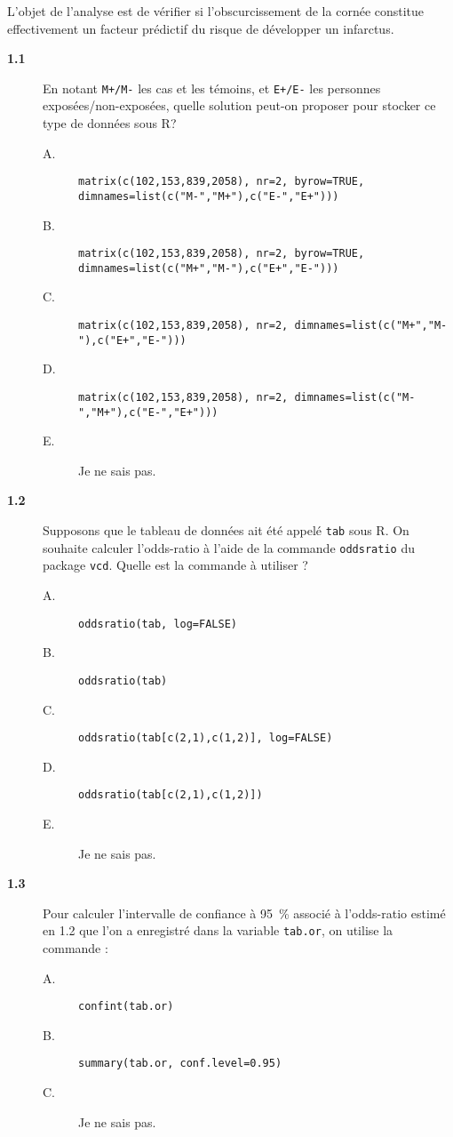 \documentclass[11pt]{report}
\theoremstyle{definition}
\newcommand{\R}{\textsf{R}\xspace}
\begin{document}
L'objet de l'analyse est de vérifier si l'obscurcissement de la cornée constitue
effectivement un facteur prédictif du risque de développer un infarctus.
\begin{description}
\item[\bf 1.1]  En notant \texttt{M+/M-} les cas et
  les témoins, et \texttt{E+/E-} les personnes exposées/non-exposées, quelle
  solution peut-on proposer pour stocker ce type de données sous \R ?
  \begin{description}
  \item[A.] \verb|matrix(c(102,153,839,2058), nr=2, byrow=TRUE, dimnames=list(c("M-","M+"),c("E-","E+")))|
  \item[B.] \verb|matrix(c(102,153,839,2058), nr=2, byrow=TRUE, dimnames=list(c("M+","M-"),c("E+","E-")))|
  \item[C.] \verb|matrix(c(102,153,839,2058), nr=2, dimnames=list(c("M+","M-"),c("E+","E-")))|
  \item[D.] \verb|matrix(c(102,153,839,2058), nr=2, dimnames=list(c("M-","M+"),c("E-","E+")))|
  \item[E.] Je ne sais pas.
  \end{description}
\item[\bf 1.2]  Supposons que le tableau de données
  ait été appelé \texttt{tab} sous \R. On souhaite calculer l'odds-ratio à
  l'aide de la commande \texttt{oddsratio} du package \texttt{vcd}. Quelle
  est la commande à utiliser ?
  \begin{description}
  \item[A.] \verb|oddsratio(tab, log=FALSE)|
  \item[B.] \verb|oddsratio(tab)|
  \item[C.] \verb|oddsratio(tab[c(2,1),c(1,2)], log=FALSE)|
  \item[D.] \verb|oddsratio(tab[c(2,1),c(1,2)])|
  \item[E.] Je ne sais pas.
  \end{description}
\item[\bf 1.3]  Pour calculer l'intervalle de
  confiance à 95~\% associé à l'odds-ratio estimé en 1.2 que l'on a
  enregistré dans la variable \texttt{tab.or}, on utilise la commande :
  \begin{description}
  \item[A.] \verb|confint(tab.or)|
  \item[B.] \verb|summary(tab.or, conf.level=0.95)|
  \item[C.] Je ne sais pas.

\end{description}
\end{description}
\end{document}
